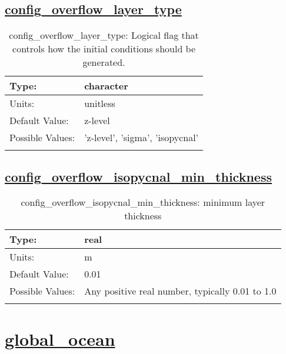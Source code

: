 \subsection[config\_overflow\_layer\_type]{\hyperref[sec:nm_tab_overflow]{config\_overflow\_layer\_type}}
\label{subsec:nm_sec_config_overflow_layer_type}
\begin{center}
\begin{longtable}{| p{2.0in} || p{4.0in} |}
    \hline
    Type: & character \\
    \hline
    Units: & \si{unitless} \\
    \hline
    Default Value: & z-level \\
    \hline
    Possible Values: & 'z-level', 'sigma', 'isopycnal' \\
    \hline
    \caption{config\_overflow\_layer\_type: Logical flag that controls how the initial conditions should be generated.}
\end{longtable}
\end{center}
\subsection[config\_overflow\_isopycnal\_min\_thickness]{\hyperref[sec:nm_tab_overflow]{config\_overflow\_isopycnal\_min\_thickness}}
\label{subsec:nm_sec_config_overflow_isopycnal_min_thickness}
\begin{center}
\begin{longtable}{| p{2.0in} || p{4.0in} |}
    \hline
    Type: & real \\
    \hline
    Units: & \si{m} \\
    \hline
    Default Value: & 0.01 \\
    \hline
    Possible Values: & Any positive real number, typically 0.01 to 1.0 \\
    \hline
    \caption{config\_overflow\_isopycnal\_min\_thickness: minimum layer thickness}
\end{longtable}
\end{center}
\section[global\_ocean]{\hyperref[sec:nm_tab_global_ocean]{global\_ocean}}
\label{sec:nm_sec_global_ocean}
